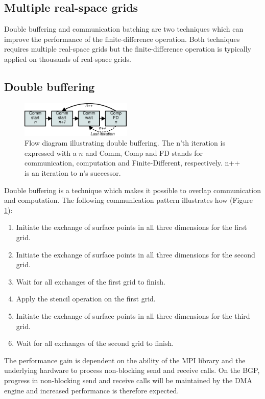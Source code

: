 \documentclass[preprint,3p,times,twocolumn]{elsarticle}
\begin{document}
\subsection{Multiple real-space grids}
Double buffering and communication batching are two techniques which can improve the performance of the finite-difference operation. Both techniques requires multiple real-space grids but the finite-difference operation is typically applied on thousands of real-space grids.

\subsection{Double buffering}

\begin{figure}
 \centering
 \includegraphics[width=200px]{gfx/commflow}
 \caption{Flow diagram illustrating double buffering. The n'th iteration is expressed with a $n$ and Comm, Comp and FD stands for communication, computation and Finite-Different, respectively. n++ is an iteration to n's successor.}
 \label{fig:commflow}
\end{figure}

Double buffering is a technique which makes it possible to overlap communication and computation. The following communication pattern illustrates how (Figure \ref{fig:commflow}):
\begin{enumerate}
 \item Initiate the exchange of surface points in all three dimensions for the first grid.
 \item Initiate the exchange of surface points in all three dimensions for the second grid.
 \item Wait for all exchanges of the first grid to finish.
 \item Apply the stencil operation on the first grid.
 \item Initiate the exchange of surface points in all three dimensions for the third grid.
 \item Wait for all exchanges of the second grid to finish.
\end{enumerate}
The performance gain is dependent on the ability of the MPI library and the underlying hardware to process non-blocking send and receive calls. On the BGP, progress in non-blocking send and receive calls will be maintained by the DMA engine and increased performance is therefore expected.
\end{document}
